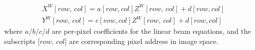 \begin{equation}
\begin{aligned}
X^W[row, \, col] = a[row, col]Z^W[row, \, col]+d[row, col]
\\%
Y^W[row, \, col] = c[row, col]Z^W[row, \, col]+d[row, col]
\end{aligned}
\label{kaiBeamEquation}
\end{equation}%
\noindent
where \(a/b/c/d\) are per-pixel coefficients for the linear beam equations, and the subscripts [\(row, \, col\)] are corresponding pixel address in image space.



